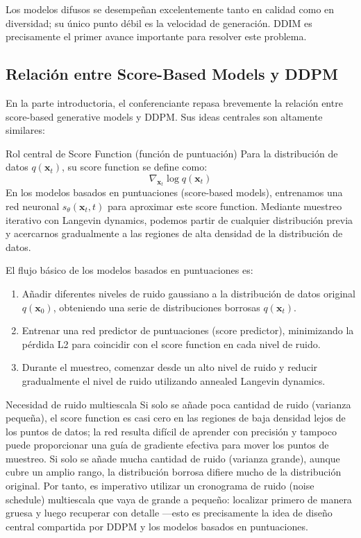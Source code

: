 Los modelos difusos se desempeñan excelentemente tanto en calidad como en diversidad; su único punto débil es la velocidad de generación. DDIM es precisamente el primer avance importante para resolver este problema.

\subsection{Relación entre Score-Based Models y DDPM}

En la parte introductoria, el conferenciante repasa brevemente la relación entre score-based generative models y DDPM. Sus ideas centrales son altamente similares:

\begin{knowledgebox}{Rol central de Score Function (función de puntuación)}
Para la distribución de datos $q(\mathbf{x}_t)$, su score function se define como:
$$
\nabla_{\mathbf{x}_t} \log q(\mathbf{x}_t)
$$
En los modelos basados en puntuaciones (score-based models), entrenamos una red neuronal $s_\theta(\mathbf{x}_t, t)$ para aproximar este score function. Mediante muestreo iterativo con Langevin dynamics, podemos partir de cualquier distribución previa y acercarnos gradualmente a las regiones de alta densidad de la distribución de datos.
\end{knowledgebox}

El flujo básico de los modelos basados en puntuaciones es:
\begin{enumerate}
    \item Añadir diferentes niveles de ruido gaussiano a la distribución de datos original $q(\mathbf{x}_0)$, obteniendo una serie de distribuciones borrosas $q(\mathbf{x}_t)$.
    \item Entrenar una red predictor de puntuaciones (score predictor), minimizando la pérdida L2 para coincidir con el score function en cada nivel de ruido.
    \item Durante el muestreo, comenzar desde un alto nivel de ruido y reducir gradualmente el nivel de ruido utilizando annealed Langevin dynamics.
\end{enumerate}

\begin{warningbox}{Necesidad de ruido multiescala}
Si solo se añade poca cantidad de ruido (varianza pequeña), el score function es casi cero en las regiones de baja densidad lejos de los puntos de datos; la red resulta difícil de aprender con precisión y tampoco puede proporcionar una guía de gradiente efectiva para mover los puntos de muestreo. Si solo se añade mucha cantidad de ruido (varianza grande), aunque cubre un amplio rango, la distribución borrosa difiere mucho de la distribución original. Por tanto, es imperativo utilizar un cronograma de ruido (noise schedule) multiescala que vaya de grande a pequeño: localizar primero de manera gruesa y luego recuperar con detalle —esto es precisamente la idea de diseño central compartida por DDPM y los modelos basados en puntuaciones.
\end{warningbox}

